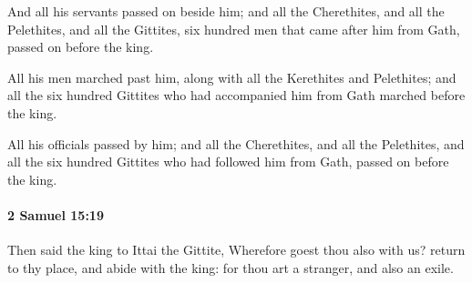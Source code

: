 			\begin{versebox}
					\item[BHS] 
					\item[ASV] And all his servants passed on beside him; and all the Cherethites, and all the Pelethites, and all the Gittites, six hundred men that came after him from Gath, passed on before the king.
					\item[NIV] All his men marched past him, along with all the Kerethites and Pelethites; and all the six hundred Gittites who had accompanied him from Gath marched before the king.
					\item[NRSV] All his officials passed by him; and all the Cherethites, and all the Pelethites, and all the six hundred Gittites who had followed him from Gath, passed on before the king.
			\end{versebox}

		\paragraph{2 Samuel 15:19} %
			\label{2SAMUEL-15-19}

			Then said the king to Ittai the Gittite, Wherefore goest thou also with us? return to thy place, and abide with the king: for thou art a stranger, and also an exile.

